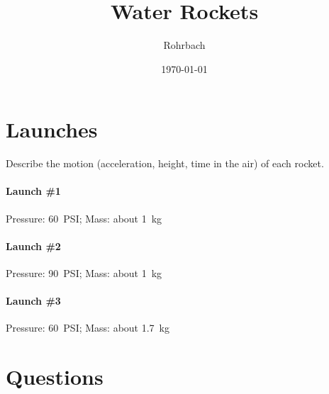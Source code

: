 \documentclass[10pt]{exam}
\title{Water Rockets}
\author{Rohrbach}
\date{\today}
\begin{document}
\maketitle


\section*{Launches}

Describe the motion (acceleration, height, time in the air) of each rocket.

\paragraph{Launch \#1} Pressure: 60~PSI; Mass: about 1~kg
\vs 

\paragraph{Launch \#2} Pressure: 90~PSI; Mass: about 1~kg
\vs 

\paragraph{Launch \#3} Pressure: 60~PSI; Mass: about 1.7~kg
\vs 

\section*{Questions}
\end{document}
